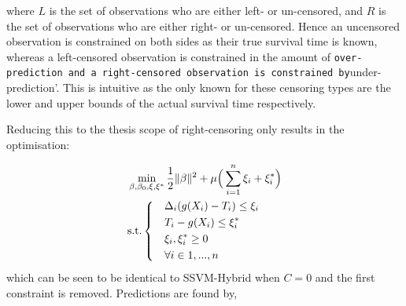\documentclass[
  letterpaper,
]{scrbook}
\theoremstyle{plain}
\theoremstyle{definition}
\theoremstyle{remark}
\begin{document}
where \(L\) is the set of observations who are either left- or
un-censored, and \(R\) is the set of observations who are either right-
or un-censored. Hence an uncensored observation is constrained on both
sides as their true survival time is known, whereas a left-censored
observation is constrained in the amount of
\texttt{over-prediction\textquotesingle{}\ and\ a\ right-censored\ observation\ is\ constrained\ by}under-prediction'.
This is intuitive as the only known for these censoring types are the
lower and upper bounds of the actual survival time respectively.

Reducing this to the thesis scope of right-censoring only results in the
optimisation:

\[
\begin{aligned}
& \min_{\beta, \beta_0, \xi, \xi^*} \frac{1}{2}\|\beta\|^2 + \mu\Big(\sum_{i = 1}^n \xi_i + \xi_i^*\Big) \\
& \textrm{s.t.}
\begin{dcases}
& \Delta_i(g(X_i) - T_i) \leq \xi_i \\
& T_i - g(X_i) \leq \xi^*_i \\
& \xi_i, \xi_i^* \geq 0 \\
& \forall i\in 1,...,n
\end{dcases}
\end{aligned}
\] which can be seen to be identical to SSVM-Hybrid when \(C=0\) and the
first constraint is removed. Predictions are found by,
\end{document}
